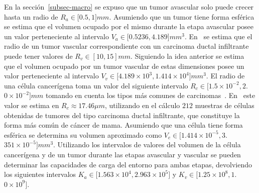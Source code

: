 \begin{table}[!ht]
\begin{center}
\vspace*{-0.5cm}
\end{center}
\caption[Par\'ametros correspondientes con la ley de crecimiento log\'istico]{Par\'ametros correspondientes con la ley de crecimiento log\'istico.}
\label{table-logistic-params}
\end{table}

En la secci\'on~\ref{subsec-macro} se expuso que un tumor avascular solo puede crecer hasta un radio de $R_a \in [0$.$5, 1]mm$. Asumiendo que un tumor tiene forma esf\'erica se estima que el volumen ocupado por el mismo durante la etapa avascular posee un valor perteneciente al intervalo $V_a \in [0$.$5236, 4$.$189]mm^3$. En~\cite{breastdata,chile} se estima que el radio de un tumor vascular correspondiente con un carcinoma ductal infiltrante puede tener valores de $R_v \in [10, 15]mm$. Siguiendo la idea anterior se estima que el volumen ocupado por un tumor vascular de estas dimensiones posee un valor perteneciente al intervalo $V_v \in [4$.$189 \times 10^3, 1$.$414 \times 10^4]mm^3$. El radio de una c\'elula cancer\'igena toma un valor del siguiente intervalo $R_c \in [1$.$5 \times 10^{-2}, 2$.$0 \times 10^{-2}]mm$ tomando en cuenta los tipos m\'as comunes de carcinomas~\cite{kansal3,breastdata,vajtai}. En~\cite{wisconsin} este valor se estima en $R_c \approx 17$.$46 \mu m$, utilizando en el c\'alculo $212$ muestras de c\'elulas obtenidas de tumores del tipo carcinoma ductal infiltrante, que constituye la forma m\'as com\'un de c\'ancer de mama. Asumiendo que una c\'elula tiene forma esf\'erica se determina su volumen aproximado como $V_{c} \in [1$.$414 \times 10^{-5}, 3$.$351 \times 10^{-5}]mm^3$. Utilizando los intervalos de valores del volumen de la c\'elula cancer\'igena y de un tumor durante las etapas avascular y vascular se pueden determinar las capacidades de carga del entorno para ambas etapas, devolviendo los siguientes intervalos $K_a \in [1$.$563 \times 10^4, 2$.$963 \times 10^5]$ y $K_v \in [1$.$25 \times 10^8, 1$.$0 \times 10^9]$.

